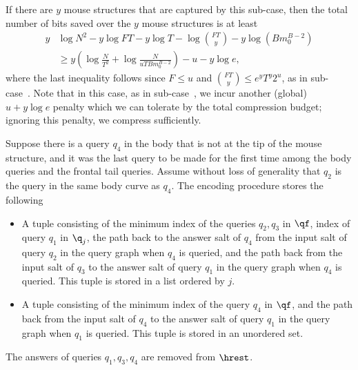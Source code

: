 { 
If there are $y$ mouse structures that are captured by this sub-case, then the total number of bits saved over the $y$ mouse structures is at least
\begin{align*}
y& \log N^2-y\log FT - y\log T -\log \binom {FT}{y} -y\log (Bm_0^{B-2}) \\ 
& \ge y\left(\log \frac{N}{T^2} +\log \frac{N}{uTBm_0^{B-2}}\right)-u -y \log e ,
\end{align*}
where the last inequality follows since $F\le u$ and $\binom{FT}{y}\le   e^yT^y 2^u$, as in sub-case~.
%
Note that in this case, as in sub-case~, we incur another (global) $u + y\log e$ penalty which we can tolerate by the total compression budget; ignoring this penalty, we compress sufficiently.



Suppose there is a query $q_4$ in the body that is not at the tip of the mouse structure, and it was the last query to be made for the first time among the body queries and the frontal tail queries. Assume without loss of generality that $q_2$ is the query in the same body curve as $q_4$. The encoding procedure stores the following
\begin{itemize}
  \item A tuple consisting of the minimum index of the queries $q_2,q_3$ in $\qf$, index of query $q_1$ in $\q_j$, the path back to the answer salt of $q_4$ from the input salt of query $q_2$ in the query graph when $q_4$ is queried, and the path back from the input salt of $q_3$ to the answer salt of query $q_1$ in the query graph when $q_4$ is queried. This tuple is stored in a list ordered by $j$.
  \item A tuple consisting of the minimum index of the query $q_4$ in $\qf$, and the path back from the input salt of $q_4$ to the answer salt of query $q_1$ in the query graph when $q_1$ is queried. This tuple is stored in an unordered set.
\end{itemize}
The answers of queries $q_1,q_3,q_4$ are removed from $\hrest$.


}
